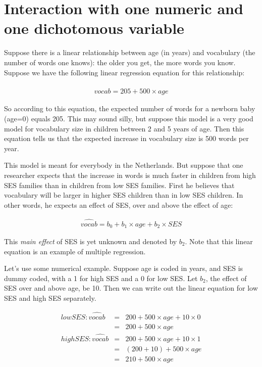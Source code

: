 \documentclass[]{report}\usepackage[]{graphicx}\usepackage[]{color}
\begin{document}
\section{Interaction with one numeric and one dichotomous variable}

Suppose there is a linear relationship between age (in years) and vocabulary (the number of words one knows): the older you get, the more words you know. Suppose we have the following linear regression equation for this relationship:


\begin{eqnarray}
\widehat{vocab} = 205 + 500 \times age 
\end{eqnarray}

So according to this equation, the expected number of words for a newborn baby (age=0) equals 205. This may sound silly, but suppose this model is a very good model for vocabulary size in children between 2 and 5 years of age. Then this equation tells us that the expected increase in vocabulary size is 500 words per year.

This model is meant for everybody in the Netherlands. But suppose that one researcher expects that the increase in words is much faster in children from high SES families than in children from low SES families. First he believes that vocabulary will be larger in higher SES children than in low SES children. In other words, he expects an effect of SES, over and above the effect of age:

\begin{eqnarray}
\widehat{vocab} = b_0 + b_1 \times age + b_2 \times SES
\end{eqnarray}

This \textit{main effect} of SES is yet unknown and denoted by $b_2$. Note that this linear equation is an example of multiple regression.


Let's use some numerical example. Suppose age is coded in years, and SES is dummy coded, with a 1 for high SES and a 0 for low SES. Let $b_2$, the effect of SES over and above age, be 10. Then we can write out the linear equation for low SES and high SES separately.


\begin{eqnarray}
low SES: \widehat{vocab} &=& 200 + 500 \times age + 10 \times 0  \\
&=& 200 + 500 \times age \\
high SES: \widehat{vocab} &=& 200 + 500 \times age + 10 \times 1  \\
&=& (200+10) + 500 \times age \\
&=& 210 + 500 \times age
\end{eqnarray}
\end{document}
